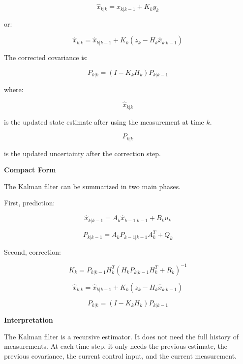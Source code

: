 \documentclass{book}
\providecommand{\ProjectDeepHeading}[2]{%
    \par\medskip\noindent\textbf{#2}\par\smallskip
}
\begin{document}
        \[
            \hat{x}_{k|k} =
            \hat{x}_{k|k-1} + K_k y_k
        \]
        
        or:
        
        \[
            \hat{x}_{k|k} =
            \hat{x}_{k|k-1} +
            K_k
            \left(
                z_k - H_k \hat{x}_{k|k-1}
            \right)
        \]
        
        The corrected covariance is:
        
        \[
            P_{k|k} =
            \left(
                I - K_k H_k
            \right)
            P_{k|k-1}
        \]
        
        where:
        
        \[
            \hat{x}_{k|k}
        \]
        
        is the updated state estimate after using the measurement at time \(k\).
        
        \[
            P_{k|k}
        \]
        
        is the updated uncertainty after the correction step.
    
    
    \ProjectDeepHeading{11}{Compact Form}
        
        The Kalman filter can be summarized in two main phases.
        
        First, prediction:
        
        \[
            \hat{x}_{k|k-1} = A_k \hat{x}_{k-1|k-1} + B_k u_k
        \]
        
        \[
            P_{k|k-1} = A_k P_{k-1|k-1} A_k^T + Q_k
        \]
        
        Second, correction:
        
        \[
            K_k =
            P_{k|k-1} H_k^T
            \left(
                H_k P_{k|k-1} H_k^T + R_k
            \right)^{-1}
        \]
        
        \[
            \hat{x}_{k|k} =
            \hat{x}_{k|k-1}
            +
            K_k
            \left(
                z_k - H_k \hat{x}_{k|k-1}
            \right)
        \]
        
        \[
            P_{k|k} =
            \left(
                I - K_k H_k
            \right)
            P_{k|k-1}
        \]
    
    
    \ProjectDeepHeading{11}{Interpretation}
        
        The Kalman filter is a recursive estimator.
        It does not need the full history of measurements.
        At each time step, it only needs the previous estimate, the previous covariance, the current control input, and the current measurement.
        
\end{document}
